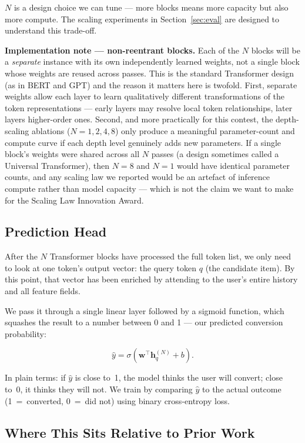 \documentclass[10pt]{article}
\begin{document}
$N$ is a design choice we can tune --- more blocks means more capacity
but also more compute. The scaling experiments in
Section~\ref{sec:eval} are designed to understand this trade-off.

\textbf{Implementation note --- non-reentrant blocks.} Each of the $N$
blocks will be a \emph{separate} instance with its own independently
learned weights, not a single block whose weights are reused across
passes. This is the standard Transformer design (as in BERT and GPT)
and the reason it matters here is twofold. First, separate weights
allow each layer to learn qualitatively different transformations of
the token representations --- early layers may resolve local token
relationships, later layers higher-order ones. Second, and more
practically for this contest, the depth-scaling ablations
($N = 1, 2, 4, 8$) only produce a meaningful parameter-count and
compute curve if each depth level genuinely adds new parameters. If a
single block's weights were shared across all $N$ passes (a design
sometimes called a Universal Transformer), then $N = 8$ and $N = 1$
would have identical parameter counts, and any scaling law we reported
would be an artefact of inference compute rather than model capacity ---
which is not the claim we want to make for the Scaling Law Innovation
Award.
\newpage
\subsection{Prediction Head}

After the $N$ Transformer blocks have processed the full token list, we
only need to look at one token's output vector: the query token $q$
(the candidate item). By this point, that vector has been enriched by
attending to the user's entire history and all feature fields.

We pass it through a single linear layer followed by a sigmoid function,
which squashes the result to a number between 0 and 1 --- our predicted
conversion probability:

\[
\hat{y} = \sigma\!\left(\mathbf{w}^\top \mathbf{h}_q^{(N)} + b\right).
\]

In plain terms: if $\hat{y}$ is close to~1, the model thinks the user
will convert; close to~0, it thinks they will not. We train by comparing
$\hat{y}$ to the actual outcome (1~=~converted, 0~=~did not) using
binary cross-entropy loss.

\subsection{Where This Sits Relative to Prior Work}
\end{document}
